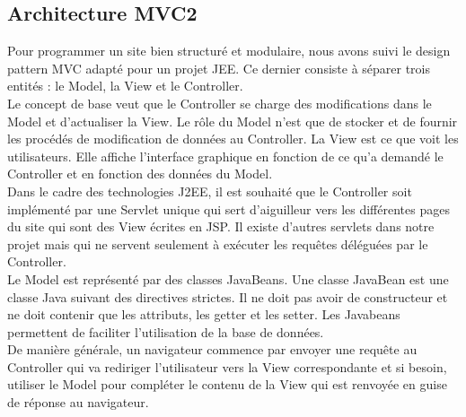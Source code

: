 \subsection{Architecture MVC2}

Pour programmer un site bien structuré et modulaire, nous avons suivi le 
design pattern MVC adapté pour un projet JEE. Ce dernier consiste à séparer trois 
entités : le Model, la View et le Controller. \\

Le concept de base veut que le Controller se charge des modifications dans le 
Model et d'actualiser la View. Le rôle du Model n'est que de stocker et de 
fournir les procédés de modification de données au Controller. La View est ce 
que voit les utilisateurs. Elle affiche l'interface graphique en fonction de ce 
qu'a demandé le Controller et en fonction des données du Model. \\

Dans le cadre des technologies J2EE, il est souhaité que le Controller soit 
implémenté par une Servlet unique qui sert d'aiguilleur vers les différentes 
pages du site qui sont des View écrites en JSP. Il existe d'autres servlets 
dans notre projet mais qui ne servent seulement à exécuter les requêtes 
déléguées par le Controller.\\

Le Model est représenté par des classes JavaBeans. Une classe JavaBean est une 
classe Java suivant des directives strictes. Il ne doit pas avoir de 
constructeur et ne doit contenir que les attributs, les getter et les setter. 
Les Javabeans permettent de faciliter l'utilisation de la base de données. \\

De manière générale, un navigateur commence par envoyer une requête au 
Controller qui va rediriger l'utilisateur vers la View correspondante et si 
besoin, utiliser le Model pour compléter le contenu de la View qui est renvoyée 
en guise de réponse au navigateur.
